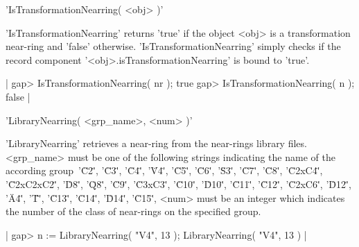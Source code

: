    
'IsTransformationNearring( <obj> )'  

'IsTransformationNearring' returns 'true' if the object <obj> is 
a transformation near-ring and 'false' otherwise. 
'Is\-Trans\-for\-ma\-tion\-Near\-ring' 
simply checks if the record component 
'<obj>.is\-Trans\-for\-ma\-tion\-Near\-ring' is 
bound to 'true'. 

|  gap> IsTransformationNearring( nr );
  true
  gap> IsTransformationNearring( n );
  false
|

   
'LibraryNearring( <grp\_name>, <num> )'  

'LibraryNearring' retrieves a near-ring from the near-rings library files. 
<grp\_name> must be one of the following strings  
indicating the name of the according group\:\ '\"C2\"', '\"C3\"', 
'\"C4\"', '\"V4\"', '\"C5\"', '\"C6\"', '\"S3\"', '\"C7\"',
'\"C8\"', '\"C2xC4\"', '\"C2xC2xC2\"', '\"D8\"', '\"Q8\"', 
'\"C9\"', '\"C3xC3\"', '\"C10\"', '\"D10\"', '\"C11\"', 
'\"C12\"', '\"C2xC6\"', '\"D12\"', '\"A4\"', '\"T\"', 
'\"C13\"', '\"C14\"', '\"D14\"', '\"C15\"', 
<num> must be an integer which indicates the number of the class of 
near-rings on the specified group. 

|  gap> n := LibraryNearring( "V4", 13 );
  LibraryNearring( "V4", 13 )
|

